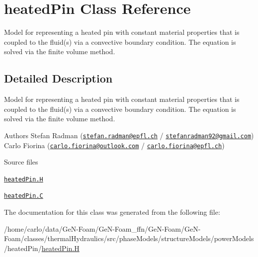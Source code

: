\hypertarget{classFoam_1_1thermoSubstructures_1_1heatedPin}{}\section{heated\+Pin Class Reference}
\label{classFoam_1_1thermoSubstructures_1_1heatedPin}


Model for representing a heated pin with constant material properties that is coupled to the fluid(s) via a convective boundary condition. The equation is solved via the finite volume method.  




\subsection{Detailed Description}
Model for representing a heated pin with constant material properties that is coupled to the fluid(s) via a convective boundary condition. The equation is solved via the finite volume method. 

\label{_Description}%
 Authors Stefan Radman (\href{mailto:stefan.radman@epfl.ch}{\tt stefan.\+radman@epfl.\+ch} / \href{mailto:stefanradman92@gmail.com}{\tt stefanradman92@gmail.\+com}) Carlo Fiorina (\href{mailto:carlo.fiorina@outlook.com}{\tt carlo.\+fiorina@outlook.\+com} / \href{mailto:carlo.fiorina@epfl.ch}{\tt carlo.\+fiorina@epfl.\+ch})

\begin{DoxyParagraph}{Source files}

\begin{DoxyItemize}
\item \href{../../../home/carlo/data/GeN-Foam/GeN-Foam_ffn/GeN-Foam/GeN-Foam/classes/thermalHydraulics/src/phaseModels/structureModels/powerModels/heatedPin/heatedPin.H}{\tt heated\+Pin.\+H} 
\item \href{../../../home/carlo/data/GeN-Foam/GeN-Foam_ffn/GeN-Foam/GeN-Foam/classes/thermalHydraulics/src/phaseModels/structureModels/powerModels/heatedPin/heatedPin.C}{\tt heated\+Pin.\+C} 
\end{DoxyItemize}
\end{DoxyParagraph}


The documentation for this class was generated from the following file\+:\begin{DoxyCompactItemize}
\item 
/home/carlo/data/\+Ge\+N-\/\+Foam/\+Ge\+N-\/\+Foam\+\_\+ffn/\+Ge\+N-\/\+Foam/\+Ge\+N-\/\+Foam/classes/thermal\+Hydraulics/src/phase\+Models/structure\+Models/power\+Models/heated\+Pin/\hyperlink{heatedPin_8H}{heated\+Pin.\+H}\end{DoxyCompactItemize}

